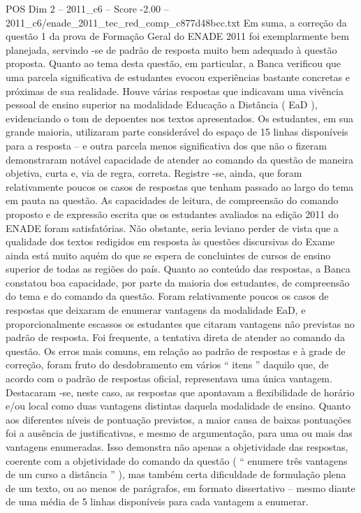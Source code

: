 \begin{textsample}{POS Dim 2 – 2011\_c6 – Score -2.00 – 2011\_c6/enade\_2011\_tec\_red\_comp\_c877d48bcc.txt}
Em suma, a correção da questão 1 da prova de Formação Geral do ENADE 2011 foi exemplarmente bem planejada, servindo -se de padrão de resposta muito bem adequado à questão proposta.
Quanto ao tema desta questão, em particular, a Banca verificou que uma parcela significativa de estudantes evocou experiências bastante concretas e próximas de sua realidade.
Houve várias respostas que indicavam uma vivência pessoal de ensino superior na modalidade Educação a Distância ( EaD ), evidenciando o tom de depoentes nos textos apresentados.
Os estudantes, em sua grande maioria, utilizaram parte considerável do espaço de 15 linhas disponíveis para a resposta – e outra parcela menos significativa dos que não o fizeram demonstraram notável capacidade de atender ao comando da questão de maneira objetiva, curta e, via de regra, correta.
Registre -se, ainda, que foram relativamente poucos os casos de respostas que tenham passado ao largo do tema em pauta na questão.
As capacidades de leitura, de compreensão do comando proposto e de expressão escrita que os estudantes avaliados na edição 2011 do ENADE foram satisfatórias.
Não obstante, seria leviano perder de vista que a qualidade dos textos redigidos em resposta às questões discursivas do Exame ainda está muito aquém do que se espera de concluintes de cursos de ensino superior de todas as regiões do país.
Quanto ao conteúdo das respostas, a Banca constatou boa capacidade, por parte da maioria dos estudantes, de compreensão do tema e do comando da questão.
Foram relativamente poucos os casos de respostas que deixaram de enumerar vantagens da modalidade EaD, e proporcionalmente escassos os estudantes que citaram vantagens não previstas no padrão de resposta.
Foi frequente, a tentativa direta de atender ao comando da questão.
Os erros mais comuns, em relação ao padrão de respostas e à grade de correção, foram fruto do desdobramento em vários “ itens ” daquilo que, de acordo com o padrão de respostas oficial, representava uma única vantagem.
Destacaram -se, neste caso, as respostas que apontavam a flexibilidade de horário e/ou local como duas vantagens distintas daquela modalidade de ensino.
Quanto aos diferentes níveis de pontuação previstos, a maior causa de baixas pontuações foi a ausência de justificativas, e mesmo de argumentação, para uma ou mais das vantagens enumeradas.
Isso demonstra não apenas a objetividade das respostas, coerente com a objetividade do comando da questão ( “ enumere três vantagens de um curso a distância ” ), mas também certa dificuldade de formulação plena de um texto, ou ao menos de parágrafos, em formato dissertativo – mesmo diante de uma média de 5 linhas disponíveis para cada vantagem a enumerar.

\end{textsample}
